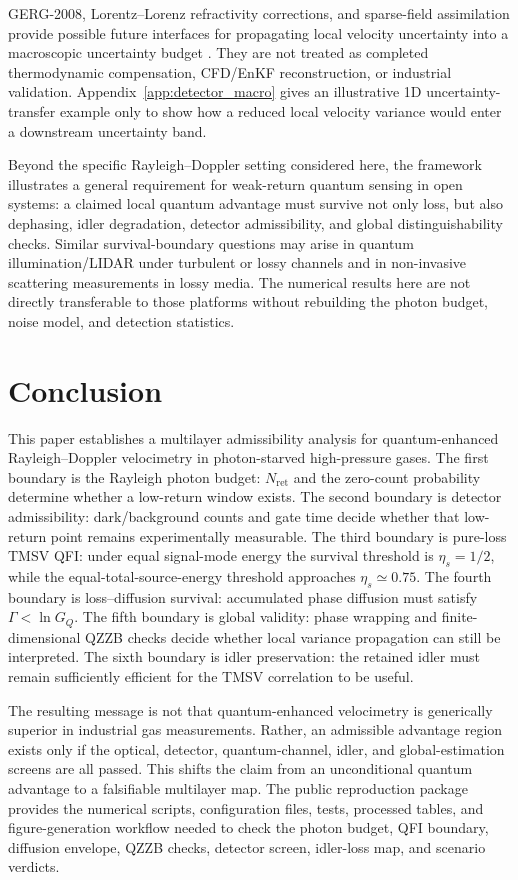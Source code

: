 \documentclass[a4paper,11pt]{article}
\numberwithin{equation}{section}
\newcommand{\Nret}{N_{\mathrm{ret}}}
\newcommand{\etas}{\eta_s}
\newcommand{\GQ}{G_Q}
\begin{document}
GERG-2008, Lorentz--Lorenz refractivity corrections, and sparse-field assimilation provide possible future interfaces for propagating local velocity uncertainty into a macroscopic uncertainty budget \cite{KunzWagner2012,Lorentz1880,Lorenz1880,JCGM2008,Evensen2003}. They are not treated as completed thermodynamic compensation, CFD/EnKF reconstruction, or industrial validation. Appendix~\ref{app:detector_macro} gives an illustrative 1D uncertainty-transfer example only to show how a reduced local velocity variance would enter a downstream uncertainty band.

Beyond the specific Rayleigh--Doppler setting considered here, the framework illustrates a general requirement for weak-return quantum sensing in open systems: a claimed local quantum advantage must survive not only loss, but also dephasing, idler degradation, detector admissibility, and global distinguishability checks. Similar survival-boundary questions may arise in quantum illumination/LIDAR under turbulent or lossy channels and in non-invasive scattering measurements in lossy media. The numerical results here are not directly transferable to those platforms without rebuilding the photon budget, noise model, and detection statistics.

\section{Conclusion}

This paper establishes a multilayer admissibility analysis for quantum-enhanced Rayleigh--Doppler velocimetry in photon-starved high-pressure gases. The first boundary is the Rayleigh photon budget: $\Nret$ and the zero-count probability determine whether a low-return window exists. The second boundary is detector admissibility: dark/background counts and gate time decide whether that low-return point remains experimentally measurable. The third boundary is pure-loss TMSV QFI: under equal signal-mode energy the survival threshold is $\etas=1/2$, while the equal-total-source-energy threshold approaches $\etas\simeq0.75$. The fourth boundary is loss--diffusion survival: accumulated phase diffusion must satisfy $\Gamma<\ln\GQ$. The fifth boundary is global validity: phase wrapping and finite-dimensional QZZB checks decide whether local variance propagation can still be interpreted. The sixth boundary is idler preservation: the retained idler must remain sufficiently efficient for the TMSV correlation to be useful.

The resulting message is not that quantum-enhanced velocimetry is generically superior in industrial gas measurements. Rather, an admissible advantage region exists only if the optical, detector, quantum-channel, idler, and global-estimation screens are all passed. This shifts the claim from an unconditional quantum advantage to a falsifiable multilayer map. The public reproduction package provides the numerical scripts, configuration files, tests, processed tables, and figure-generation workflow needed to check the photon budget, QFI boundary, diffusion envelope, QZZB checks, detector screen, idler-loss map, and scenario verdicts.
\end{document}

